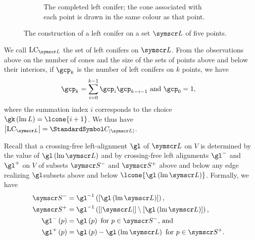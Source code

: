 \begin{figure}[ht!]
\begin{subfigure}{.45\textwidth}
  \caption{The completed left conifer; the cone associated with each point is drawn in the same colour
  as that point.}
\end{subfigure}
\caption{The construction of a left conifer on a set $\pointset L$ of five points.}
\label{figLeftConifer}
\end{figure}

We call $\LC {\pointset L}$ the set of left conifers on $\pointset L$. From the observations above on the number
of cones and the
size of the sets of points above and below their interiors, if $\gcp_k$ is the number of left conifers on $k$ points,
we have
\[
\gcp_k=\sum{i=0}[k-1]\gcp_{i}\gcp_{k-i-1} \text{ and } \gcp_0=1\text,
\]
where the summation index $i$ corresponds to the choice $\gk\of{\leftmost L}=\lcone {i+1}$.
We thus have $\Cardinality{\LC {\pointset L}} = \CatalanNumber {\Cardinality{\pointset L}}$.

Recall that a crossing-free left-alignment $\gl$ of $\pointset L$ on $V$
is determined by the value of $\gl\of{\leftmost\pointset L}$ and by
crossing-free left alignments $\gl^-$ and $\gl^+$ on $V$
of subsets $\pointset S^-$ and $\pointset S^+$ above and below any edge
realizing $\gl$\idest subsets above and below $\lcone{\gl\of{\leftmost\pointset L}}$.
Formally, we have
\begin{align*}
\pointset S^- &= \gl^{-1}\of{[\gl\of{\leftmost\pointset L}]}\text,\\
\pointset S^+ &= \gl^{-1}\of{[\Cardinality{\pointset L}]\setminus[\gl\of{\leftmost\pointset L}]}\text,\\
\gl^-\of{p} &= \gl\of{p} \text{ for $p\in\pointset S^-$, and}\\
\gl^+\of{p} &= \gl\of{p}-\gl\of{\leftmost\pointset L} \text{ for $p\in\pointset S^+$.}
\end{align*}

